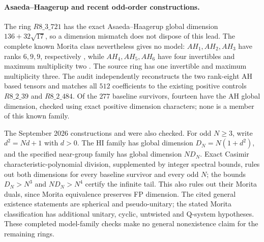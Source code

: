 \paragraph{Asaeda--Haagerup and recent odd-order constructions.}
The ring \(R8\_3\_721\) has the exact Asaeda--Haagerup global dimension
\(136+32\sqrt{17}\), so a dimension mismatch does not dispose of this
lead.  The complete known Morita class nevertheless gives no model:
\(AH_1,AH_2,AH_3\) have ranks \(6,9,9\), respectively
\cite[Section~4.3, Tables~1--3]{GSAsaedaMorita}, while
\(AH_4,AH_5,AH_6\) have four invertibles and maximum multiplicity two
\cite[Lemmas~3.4, 3.7, 3.15 and Theorem~4.21]{AH}.
The source ring has one invertible and maximum multiplicity three.
The audit independently reconstructs the two rank-eight AH based
tensors and matches all \(512\) coefficients to the existing positive
controls \(R8\_2\_39\) and \(R8\_2\_484\).  Of the \(277\) baseline
survivors, fourteen have the AH global dimension, checked using exact
positive dimension characters; none is a member of this known family.

The September 2026 constructions
\cite[Theorem~2.1]{HuangOddHI2026} and
\cite[Theorems~A, 4.4 and 6.3]{GSYOddHI2026} were also checked.
For odd \(N\geq3\), write \(d^2=Nd+1\) with \(d>0\).
The HI family has global dimension \(D_N=N(1+d^2)\), and the specified
near-group family has global dimension \(ND_N\).
Exact Casimir characteristic-polynomial division, supplemented by
integer spectral bounds, rules out both dimensions for every baseline
survivor and every odd \(N\); the bounds \(D_N>N^3\) and
\(ND_N>N^4\) certify the infinite tail.  This also rules out their
Morita duals, since Morita equivalence preserves FP dimension.
The cited general existence statements are spherical and pseudo-unitary;
the stated Morita classification has additional unitary, cyclic,
untwisted and Q-system hypotheses.  These completed model-family
checks make no general nonexistence claim for the remaining rings.
